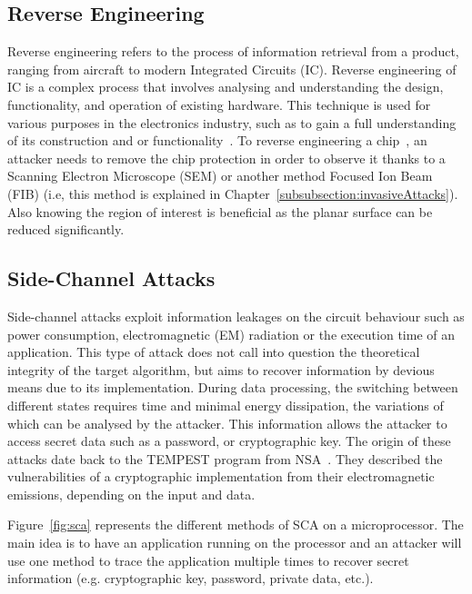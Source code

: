 \subsection{Reverse Engineering}
Reverse engineering refers to the process of information retrieval from a product, ranging from aircraft to modern Integrated Circuits (IC). Reverse engineering of IC is a complex process that involves analysing and understanding the design, functionality, and operation of existing hardware. This technique is used for various purposes in the electronics industry, such as to gain a full understanding of its construction and or functionality~\cite{QCFASWCT-16-emergTech}.
To reverse engineering a chip~\cite{FSKWERP-17-ivsw}, an attacker needs to remove the chip protection in order to observe it thanks to a Scanning Electron Microscope (SEM) or another method Focused Ion Beam (FIB) (i.e, this method is explained in Chapter~\ref{subsubsection:invasiveAttacks}). Also knowing the region of interest is beneficial as the planar surface can be reduced significantly.

\subsection{Side-Channel Attacks}
Side-channel attacks exploit information leakages on the circuit behaviour such as power consumption, electromagnetic (EM) radiation or the execution time of an application.
This type of attack does not call into question the theoretical integrity of the target algorithm, but aims to recover information by devious means due to its implementation. During data processing, the switching between different states requires time and minimal energy dissipation, the variations of which can be analysed by the attacker.
This information allows the attacker to access secret data such as a password, or cryptographic key. The origin of these attacks date back to the \mbox{TEMPEST} program from NSA~\cite{F-72-nsa}. They described the vulnerabilities of a cryptographic implementation from their electromagnetic emissions, depending on the input and data.

Figure~\ref{fig:sca} represents the different methods of SCA on a microprocessor. The main idea is to have an application running on the processor and an attacker will use one method to trace the application multiple times to recover secret information (e.g. cryptographic key, password, private data, etc.).

